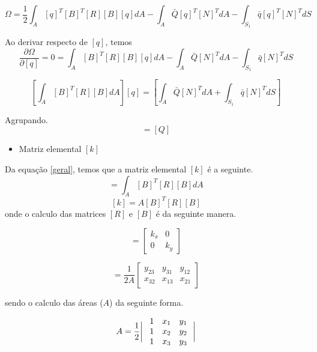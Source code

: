 \documentclass{article} %
\begin{document}
\begin{equation}
\Omega=\frac{1}{2}\int_{A}[q]^T[B]^T[R][B][q]dA-\int_{A}\bar{Q}[q]^T[N]^TdA-\int_{S_1}\bar{q}[q]^T[N]^TdS
\end{equation}

Ao derivar respecto de \([q]\), temos
\begin{equation}
\frac{\partial\Omega}{\partial [q]}=0=\int_{A}[B]^T[R][B][q]dA-\int_{A}\bar{Q}[N]^TdA-\int_{S_1}\bar{q}[N]^TdS
\end{equation}

\begin{equation}\label{geral}
\left[\int_{A}[B]^T[R][B]dA\right][q]=\left[\int_{A}\bar{Q}[N]^TdA+\int_{S_1}\bar{q}[N]^TdS\right]
\end{equation}

Agrupando.
\begin{equation}
[k][q]=[Q]
\end{equation}


\begin{itemize}
	\item Matriz elemental \([k]\)	
\end{itemize}

Da equação \ref{geral}, temos que a matriz elemental \([k]\) é a seguinte.
\begin{equation}
[k]=\int_{A}[B]^T[R][B]dA
\end{equation}
\begin{equation}\label{kelemento}
[k]=A[B]^T[R][B]
\end{equation}
onde o calculo das matrices \([R]\)  e \([B]\) é da seguinte manera.



\begin{equation}
[R]=\begin{bmatrix}
k_x&0\\0&k_y
\end{bmatrix}
\end{equation}

\begin{equation}
[B]=\frac{1}{2A}\begin{bmatrix}
y_{23}&y_{31}&y_{12}\\x_{32}&x_{13}&x_{21}
\end{bmatrix}
\end{equation}

sendo o calculo das áreas (\(A\)) da seguinte forma.

\begin{equation}
A=\frac{1}{2}\biggr|\color{white}\begin{bmatrix}\color{black}
1&\color{black}x_1&\color{black}y_1\\\color{black}1&\color{black}x_2&\color{black}y_2\\\color{black}1&\color{black}x_3&\color{black}y_3
\color{white}\end{bmatrix}\color{black}\biggr|
\end{equation}
\end{document}
